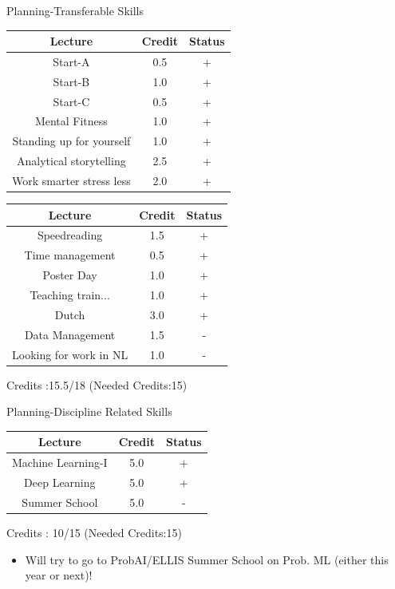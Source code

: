 \documentclass[aspectratio=169]{beamer}
\begin{document}
\begin{frame}{Planning-Transferable Skills}
  \begin{minipage}{0.5\textwidth}
  \centering
  \begin{tabular}{ c|c|c } 
    \textbf{Lecture} & \textbf{Credit}& \textbf{Status} \\ 
    \hline
    Start-A& 0.5 & + \\ 
    Start-B& 1.0 & + \\ 
    Start-C& 0.5 & + \\ 
    Mental Fitness& 1.0 & + \\ 
    Standing up for yourself & 1.0 & + \\ 
    Analytical storytelling & 2.5 & + \\ 
    Work smarter stress less & 2.0 & + \\ 
    \hline
  \end{tabular}
  \end{minipage}%
  \begin{minipage}{0.5\textwidth}
  \centering
  \begin{tabular}{ c|c|c } 
    \textbf{Lecture} & \textbf{Credit}& \textbf{Status} \\ 
    \hline
    Speedreading & 1.5 & + \\ 
    Time management& 0.5 & + \\ 
    Poster Day& 1.0 & + \\ 
    Teaching train...& 1.0 & + \\ 
    Dutch & 3.0 & + \\ 
    \color{Pink}Data Management & 1.5 & - \\ 
    \color{Pink}Looking for work in NL & 1.0 & - \\ 
    \hline
  \end{tabular}
  \end{minipage}
\centering
  Credits :15.5/18 (Needed Credits:15)
\end{frame}

\begin{frame}{Planning-Discipline Related Skills}
  \centering
  \begin{tabular}{ c|c|c } 
    \textbf{Lecture} & \textbf{Credit}& \textbf{Status} \\ 
    \hline
    Machine Learning-I& 5.0 & + \\ 
    Deep Learning & 5.0 & + \\ 
    \color{Pink}Summer School & 5.0 & - \\ 
    \hline
  \end{tabular}

    Credits : 10/15 (Needed Credits:15)
  \begin{itemize}
    \item Will try to go to ProbAI/ELLIS Summer School on Prob. ML (either this year or next)! 
  \end{itemize}
\end{frame}
\end{document}

